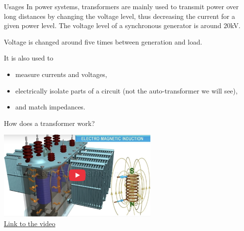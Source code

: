 \begin{frame}{Usages}
In power systems, transformers are mainly used to transmit power over long distances by changing the voltage level, 
thus decreasing the current for a given power level. The voltage level of a synchronous generator is around 20kV.

Voltage is changed around five times between generation and load.

It is also used to 
\begin{itemize}
    \item \alert{measure} currents and voltages, 
    \item electrically \alert{isolate} parts of a circuit (not the auto-transformer we will see), 
    \item and \alert{match} impedances.
\end{itemize}
\end{frame}

\begin{frame}{How does a transformer work?}
\begin{center}
    \includegraphics[width=0.6\textwidth]{images/how_a_tfo_works.png}\\
    \href{https://youtu.be/vh_aCAHThTQ}{\underline{Link to the video}}
\end{center}
\end{frame}


